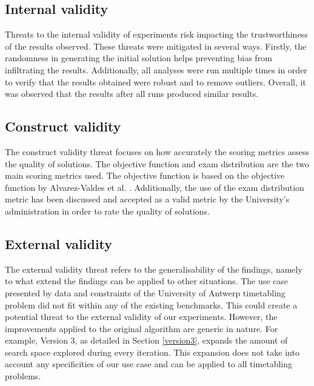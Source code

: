 \subsection{Internal validity}

Threats to the internal validity of experiments risk impacting the trustworthiness of the results observed. These threats were mitigated in several ways. Firstly, the randomness in generating the initial solution helps preventing bias from infiltrating the results. Additionally, all analyses were run multiple times in order to verify that the results obtained were robust and to remove outliers. Overall, it was observed that the results after all runs produced similar results.



\subsection{Construct validity}

The construct validity threat focuses on how accurately the scoring metrics assess the quality of solutions. The objective function and exam distribution are the two main scoring metrics used. The objective function is based on the objective function by Alvarez-Valdes et al. \cite{alvarez1997}. Additionally, the use of the exam distribution metric has been discussed and accepted as a valid metric by the University's administration in order to rate the quality of solutions.

\subsection{External validity}

The external validity threat refers to the generalisability of the findings, namely to what extend the findings can be applied to other situations. The use case presented by data and constraints of the University of Antwerp timetabling problem did not fit within any of the existing benchmarks. This could create a potential threat to the external validity of our experiments. However, the improvements applied to the original algorithm are generic in nature. For example, Version 3, as detailed in Section \ref{version3}, expands the amount of search space explored during every iteration. This expansion does not take into account any specificities of our use case and can be applied to all timetabling problems.

